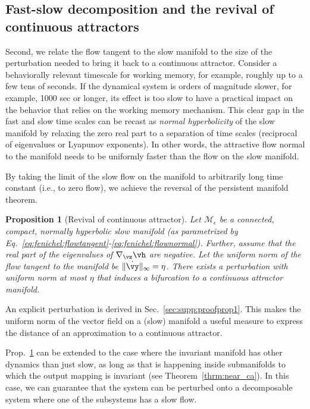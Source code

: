 \documentclass{article} %
\newcounter{ct}
\newcommand{\dm}[1]{\ensuremath{\mathrm{d}{#1}}} %
\newcommand{\manifold}{\mathcal{M}}
\newtheorem{prop}{Proposition}
\theoremstyle{definition}
\theoremstyle{remark}
\begin{document}
\subsection{Fast-slow decomposition and the revival of continuous attractors}\label{sec:revival}
Second, we relate the flow tangent to the slow manifold to the size of the perturbation needed to bring it back to a continuous attractor. 
Consider a behaviorally relevant timescale for working memory, for example, roughly up to a few tens of seconds.
If the dynamical system is orders of magnitude slower, for example, 1000 sec or longer, its effect is too slow to have a practical impact on the behavior that relies on the working memory mechanism.
This clear gap in the fast and slow time scales can be recast as \emph{normal hyperbolicity} of the slow manifold by relaxing the zero real part to a separation of time scales (reciprocal of eigenvalues or Lyapunov exponents).
In other words, the attractive flow normal to the manifold needs to be uniformly faster than the flow on the slow manifold.

By taking the limit of the slow flow on the manifold to arbitrarily long time constant (i.e., to zero flow), we achieve the reversal of the persistent manifold theorem.
\begin{prop}[Revival of continuous attractor]\label{prop:revival}
Let \(\manifold_\epsilon\) be a connected, compact, normally hyperbolic slow manifold  (as parametrized by Eq.~\eqref{eq:fenichel:flowtangent}-\eqref{eq:fenichel:flownormal}).
Further, assume that the real part of the eigenvalues of \(\nabla_\vz \vh\) are negative. %
Let the uniform norm of the flow tangent to the manifold be \(\|\dot \vy\|_\infty=\eta\).
There exists a perturbation with uniform norm at most \(\eta\) that induces a bifurcation to a continuous attractor manifold. %
\end{prop}

An explicit perturbation is derived in Sec.~\ref{sec:supp:proofprop1}.
This makes the uniform norm of the vector field on a (slow) manifold a useful measure to express the distance of an approximation to a continuous attractor.


Prop.~\ref{prop:revival}  can be extended to the case where the invariant manifold has other dynamics than just slow, as long as that is happening inside submanifolds to which the output mapping is invariant (see Theorem~\ref{thrm:near_ca}).
In this case, we can guarantee that the system can be perturbed onto a decomposable system where one of the subsystems has a slow flow.
\end{document}
